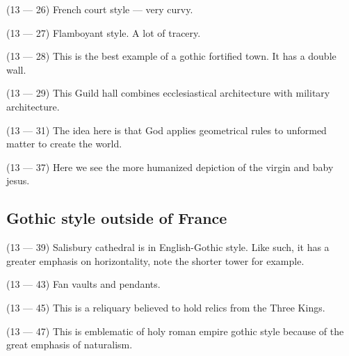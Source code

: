 \documentclass{article}
\begin{document}
    \begin{spacing}{1.2}
    \newpage
        (13 --- 26) French court style --- very curvy.

        (13 --- 27) Flamboyant style. A lot of tracery.

        (13 --- 28) This is the best example of a gothic fortified town. It has a double wall.

        (13 --- 29) This Guild hall combines ecclesiastical architecture with military architecture.

        (13 --- 31) The idea here is that God applies geometrical rules to unformed matter to create the world.

        (13 --- 37) Here we see the more humanized depiction of the virgin and baby jesus.

        \subsection{Gothic style outside of France}
        (13 --- 39) Salisbury cathedral is in English-Gothic style. Like such, it has a greater emphasis on horizontality, note the shorter tower for example.

        (13 --- 43) Fan vaults and pendants.

        (13 --- 45) This is a reliquary believed to hold relics from the Three Kings.
        
        (13 --- 47) This is emblematic of holy roman empire gothic style because of the great emphasis of naturalism.


    \end{spacing}
\end{document}
